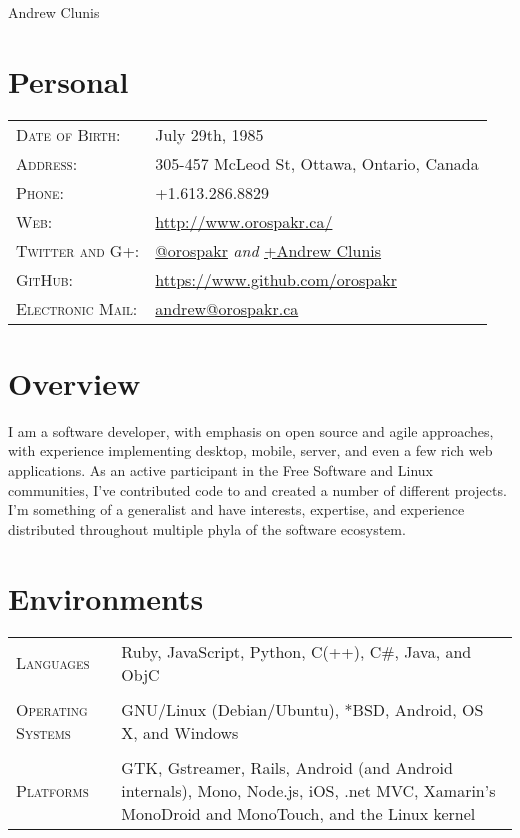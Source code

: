 \documentclass[letterpaper,10pt]{article}
\begin{document}
\pagestyle{empty} %

\par{\centering
{\Huge Andrew \textsc Clunis
}\bigskip\par}

\section{Personal}
\begin{longtable}{p{3cm}|p{12cm}}
  \textsc{Date of Birth:} & July 29th, 1985 \\
  \textsc{Address:} & 305-457 McLeod St, Ottawa, Ontario, Canada \\
  \textsc{Phone:} & +1.613.286.8829 \\
  \textsc{Web:} &  \href{http://www.orospakr.ca/}{http://www.orospakr.ca/} \\
  \textsc{Twitter and G+:} & \href{http://twitter.com/orospakr}{@orospakr} \emph{and} \href{https://plus.google.com/101728978406554574081}{+Andrew Clunis}\\
  \textsc{GitHub:} & \href{https://github.com/orospakr}{https://www.github.com/orospakr} \\
  \textsc{Electronic Mail:} & \href{mailto:andrew@orospakr.ca}{andrew@orospakr.ca} \\
\end{longtable}

\section{Overview}
I am a software developer, with emphasis on open source and agile
approaches, with experience implementing desktop, mobile, server, and
even a few rich web applications.  As an active participant in the
Free Software and Linux communities, I've contributed code to and
created a number of different projects.  I'm something of a generalist
and have interests, expertise, and experience distributed throughout
multiple phyla of the software ecosystem.

\section{Environments}
\begin{longtable}{p{3cm}|p{12cm}}
  \textsc{Languages} & Ruby, JavaScript, Python, C(++), C\#, Java, and ObjC \\
  \multicolumn{2}{c}{} \\
  \textsc{Operating Systems} & GNU/Linux (Debian/Ubuntu), *BSD, Android, OS X, and Windows\\
  \multicolumn{2}{c}{} \\
  \textsc{Platforms} & GTK, Gstreamer, Rails, Android (and Android internals), Mono, Node.js, iOS, .net MVC, Xamarin's MonoDroid and MonoTouch, and the Linux kernel
\end{longtable}
\end{document}
